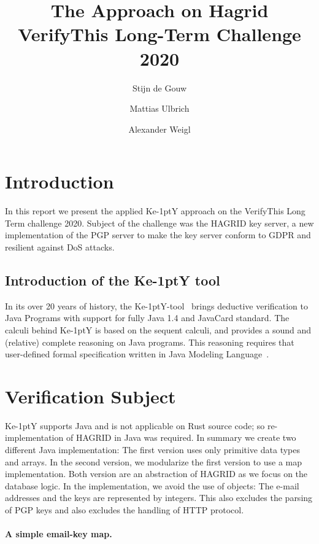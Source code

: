\documentclass{llncs}
\title{The \KeY Approach on Hagrid
  \\{\small VerifyThis Long-Term Challenge 2020 }}
\author{ Stijn de Gouw \and Mattias Ulbrich \and Alexander Weigl }
\institute{Open University \and Karlsruhe Institute of Technology}
\newcommand{\KeY}{Ke\kern-1ptY\xspace}
\begin{document}
\maketitle

\section{Introduction}

In this report we present the applied \KeY approach on the VerifyThis Long Term
challenge 2020. Subject of the challenge was the HAGRID key server, a new
implementation of the PGP server to make the key server conform to
GDPR and resilient against DoS attacks.



\subsection{Introduction of the \KeY tool}

In its over 20 years of history, the \KeY-tool~\cite{KeyBook2} brings deductive
verification to Java Programs with support for fully Java 1.4 and JavaCard
 standard.
%
The calculi behind \KeY is based on the sequent calculi, and provides a sound
and (relative) complete reasoning on Java programs. This reasoning requires that
user-defined formal specification written in Java Modeling Language~\cite{Jml}.


\section{Verification Subject}

\KeY supports Java and is not applicable on Rust source code; so
re-implementation of HAGRID in Java was required. In summary we create two
different Java implementation: The first version uses only primitive data types
and arrays. In the second version, we modularize the first version to use a map
implementation. Both version are an abstraction of HAGRID as we focus on the
database logic. In the implementation, we avoid the use of objects: The e-mail
addresses and the keys are represented by integers. This also excludes the
parsing of PGP keys and also excludes the handling of HTTP protocol.

\paragraph{A simple email-key map.}
\end{document}
